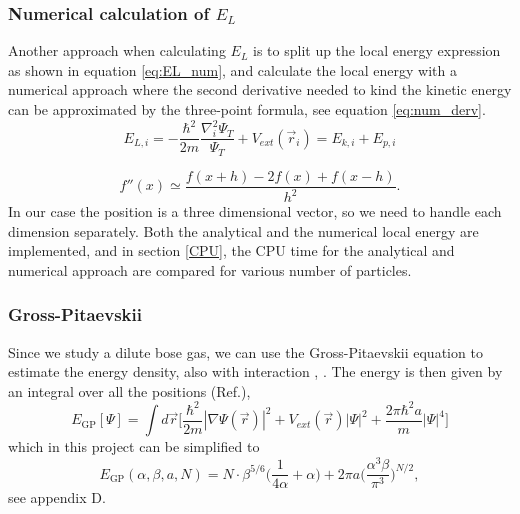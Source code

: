 \documentclass[norsk,a4paper,12pt]{article}
\begin{document}
\subsubsection{Numerical calculation of $E_L$} \label{Numerical_calc_E_L}

Another approach when calculating $E_L$ is to split up the local energy expression as shown in equation \ref{eq:EL_num}, and calculate the local energy with a numerical approach where the second derivative needed to kind the kinetic energy can be approximated by the three-point formula, see equation \ref{eq:num_derv}.
\begin{equation}
\label{eq:EL_num}
E_{L,i}=-\frac{\hbar^2}{2m}\frac{\nabla_i^2\Psi_T}{\Psi_T}+V_{ext}(\vec{r}_i)=E_{k,i}+E_{p,i}
\end{equation}

\begin{equation}
\label{eq:num_derv}
f''(x)\simeq\frac{f(x+h)-2f(x)+f(x-h)}{h^2}.
\end{equation}
In our case the position is a three dimensional vector, so we need to handle each dimension separately. Both the analytical and the numerical local energy are implemented, and in section \ref{CPU}, the CPU time for the analytical and numerical approach are compared for various number of particles. 

\subsubsection{Gross-Pitaevskii}
Since we study a dilute bose gas, we can use the Gross-Pitaevskii equation to estimate the energy density, also with interaction \cite{Gross}, \cite{Pitaevskii}. The energy is then given by an integral over all the positions (Ref.\cite{Nilsen}), 
\begin{equation}
E_{\text{GP}}[\Psi]=\int d\vec{r}\bigg[\frac{\hbar^2}{2m}|\nabla\Psi(\vec{r})|^2+V_{ext}(\vec{r})|\Psi|^2+\frac{2\pi\hbar^2a}{m}|\Psi|^4\bigg]
\end{equation}
which in this project can be simplified to
\begin{equation}
E_{\text{GP}}(\alpha, \beta, a, N)=N\cdot\beta^{5/6}\bigg(\frac{1}{4\alpha}+\alpha\bigg)+2\pi a\bigg(\frac{\alpha^3\beta}{\pi^3}\bigg)^{N/2},
\end{equation}
see appendix D.
\end{document}

